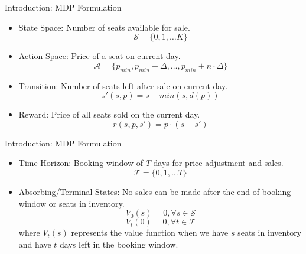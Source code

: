 \begin{frame}{Introduction: MDP Formulation}
\begin{itemize}
    \item State Space: Number of seats available for sale.
    $$\mathcal{S} = \{0, 1, \ldots K\}$$
    \item Action Space: Price of a seat on current day.
    $$\mathcal{A} = \{p_{min}, p_{min} + \Delta, \ldots, p_{min} + n \cdot \Delta\}$$
    \item Transition: Number of seats left after sale on current day.
    $$s'(s, p) = s - min(s, d(p))$$
    \item Reward: Price of all seats sold on the current day.
    $$r(s, p, s') = p \cdot (s - s')$$
\end{itemize}
\end{frame}

\begin{frame}{Introduction: MDP Formulation}
\begin{itemize}
    \item Time Horizon: Booking window of $T$ days for price adjustment and sales.
    $$\mathcal{T} = \{0, 1, \ldots T\}$$
    \item Absorbing/Terminal States: No sales can be made after the end of booking window or seats in inventory.
    $$V_0(s) = 0, \forall s \in \mathcal{S}$$
    $$V_t(0) = 0, \forall t \in \mathcal{T}$$
    where $V_t(s)$ represents the value function when we have $s$ seats in inventory and have $t$ days left in the booking window.
\end{itemize}
\end{frame}
